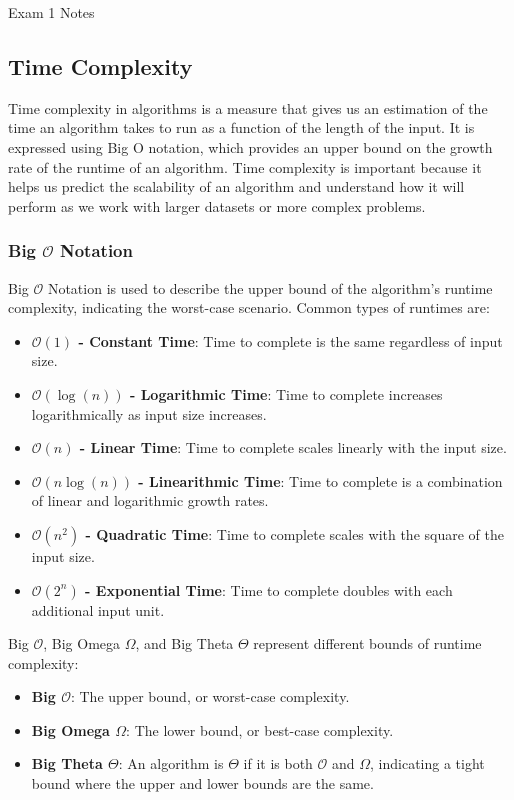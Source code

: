 \begin{examnotes}{Exam 1 Notes}
    \subsection*{Time Complexity}

    Time complexity in algorithms is a measure that gives us an estimation of the time an algorithm takes to run as a function of the length of the input. It is expressed using Big O notation, which 
    provides an upper bound on the growth rate of the runtime of an algorithm. Time complexity is important because it helps us predict the scalability of an algorithm and understand how it will 
    perform as we work with larger datasets or more complex problems.

    \subsubsection*{Big $\mathcal{O}$ Notation}

    Big $\mathcal{O}$ Notation is used to describe the upper bound of the algorithm's runtime complexity, indicating the worst-case scenario. Common types of runtimes are:

    \begin{itemize}
        \item \textbf{$\mathcal{O}(1)$ - Constant Time}: Time to complete is the same regardless of input size.
        \item \textbf{$\mathcal{O}(\log{(n)})$ - Logarithmic Time}: Time to complete increases logarithmically as input size increases.
        \item \textbf{$\mathcal{O}(n)$ - Linear Time}: Time to complete scales linearly with the input size.
        \item \textbf{$\mathcal{O}(n\log{(n)})$ - Linearithmic Time}: Time to complete is a combination of linear and logarithmic growth rates.
        \item \textbf{$\mathcal{O}(n^{2})$ - Quadratic Time}: Time to complete scales with the square of the input size.
        \item \textbf{$\mathcal{O}(2^{n})$ - Exponential Time}: Time to complete doubles with each additional input unit.
    \end{itemize}

    \noindent Big $\mathcal{O}$, Big Omega $\Omega$, and Big Theta $\Theta$ represent different bounds of runtime complexity:

    \begin{itemize}
        \item \textbf{Big $\mathcal{O}$}: The upper bound, or worst-case complexity.
        \item \textbf{Big Omega $\Omega$}: The lower bound, or best-case complexity.
        \item \textbf{Big Theta $\Theta$}: An algorithm is $\Theta$ if it is both $\mathcal{O}$ and $\Omega$, indicating a tight bound where the upper and lower bounds are the same.
    \end{itemize}


\end{examnotes}
